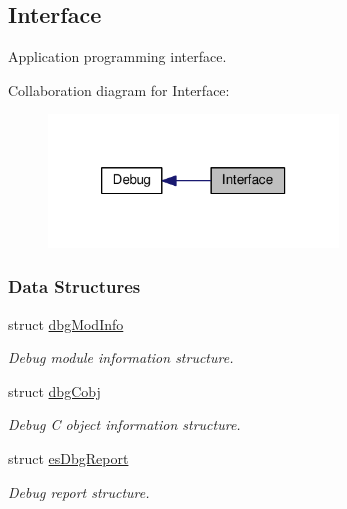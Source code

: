 \hypertarget{group__dbg__intf}{\subsection{Interface}
\label{group__dbg__intf}
}


Application programming interface.  


Collaboration diagram for Interface\-:\nopagebreak
\begin{figure}[H]
\begin{center}
\leavevmode
\includegraphics[width=218pt]{group__dbg__intf}
\end{center}
\end{figure}
\subsubsection*{Data Structures}
\begin{DoxyCompactItemize}
\item 
struct \hyperlink{structdbgModInfo}{dbg\-Mod\-Info}
\begin{DoxyCompactList}\small\item\em Debug module information structure. \end{DoxyCompactList}\item 
struct \hyperlink{structdbgCobj}{dbg\-Cobj}
\begin{DoxyCompactList}\small\item\em Debug C object information structure. \end{DoxyCompactList}\item 
struct \hyperlink{structesDbgReport}{es\-Dbg\-Report}
\begin{DoxyCompactList}\small\item\em Debug report structure. \end{DoxyCompactList}\end{DoxyCompactItemize}
